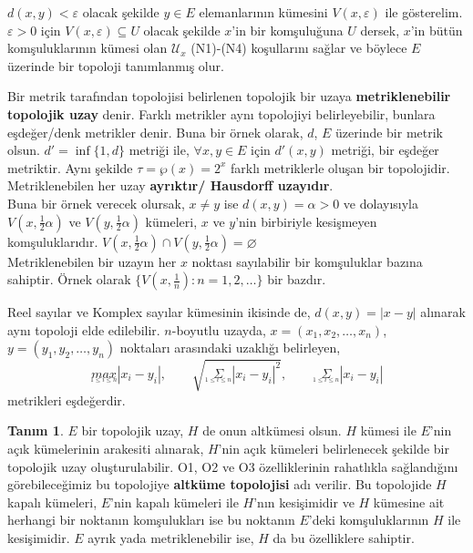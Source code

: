 \documentclass[11pt]{article}
\theoremstyle{plain}
\theoremstyle{definition}
\newtheorem{definition}{Tanım}
\theoremstyle{remark}
\numberwithin{equation}{section}
\renewcommand{\%}{{\small \%}}
\begin{document}
$d\left(x,y\right)<\varepsilon$ olacak şekilde $y\in E$ elemanlarının kümesini $V\left(x,\varepsilon \right)$ ile gösterelim.  $\varepsilon >0$ için $V\left(x,\varepsilon \right)\subseteq U$ olacak şekilde $x$'in bir komşuluğuna $U$ dersek, $x$'in bütün komşuluklarının kümesi olan $\mathscr{U}_x$ (N1)-(N4) koşullarını sağlar ve böylece $E$ üzerinde bir topoloji tanımlanmış olur.

Bir metrik tarafından topolojisi belirlenen topolojik bir uzaya \textbf{metriklenebilir topolojik uzay} denir. Farklı metrikler aynı topolojiyi belirleyebilir, bunlara eşdeğer/denk metrikler denir. Buna bir örnek olarak, $d$, $E$ üzerinde bir metrik olsun. $d'=\inf\{1,d\}$ metriği ile, $\forall x,y\in E$ için $d'\left(x,y\right)$ metriği, bir eşdeğer metriktir. Aynı şekilde $\tau=\wp(x)=2^x$ farklı metriklerle oluşan bir topolojidir.\\
Metriklenebilen her uzay  \textbf{ayrıktır/ Hausdorff uzayıdır}.\\
Buna bir örnek verecek olursak, $x\neq y$ ise $d\left(x,y\right)=\alpha >0$ ve dolayısıyla $V\left(x,\frac{1}{2}\alpha \right)$ ve $V\left(y,\frac{1}{2}\alpha \right)$ kümeleri, $x$ ve $y$'nin birbiriyle kesişmeyen komşuluklarıdır. 
$V\left(x,\frac{1}{2}\alpha \right)\cap V\left(y,\frac{1}{2}\alpha \right)=\varnothing$\\
Metriklenebilen bir uzayın her $x$ noktası sayılabilir bir komşuluklar bazına sahiptir. Örnek olarak $\{V\left(x,\frac{1}{n}\right): n=1,2,\ldots\}$ bir bazdır.

Reel sayılar ve Komplex sayılar kümesinin ikisinde de, $d\left(x,y\right)=|x-y|$ alınarak aynı topoloji elde edilebilir.
$n$-boyutlu uzayda, $x=(x_1 ,x_2 ,\ldots ,x_n)$, $y=(y_1 ,y_2 ,\ldots ,y_n)$ noktaları arasındaki uzaklığı belirleyen,
\[
\underset {_{1\leq i\leq n}}{max}|x_i -y_i|,\qquad \sqrt{\underset{_{1\leq i\leq n}}{\Sigma}|x_i -y_i|^2},\qquad \underset{_{1\leq i\leq n}}{\Sigma}|x_i -y_i|
\]
metrikleri eşdeğerdir.

\begin{definition}
$E$ bir topolojik uzay, $H$ de onun altkümesi olsun. $H$ kümesi ile $E$'nin açık kümelerinin arakesiti alınarak, $H$'nin açık kümeleri belirlenecek şekilde bir topolojik uzay oluşturulabilir. O1, O2 ve O3 özelliklerinin rahatlıkla sağlandığını görebileceğimiz bu topolojiye \textbf{altküme topolojisi} adı verilir. Bu topolojide $H$ kapalı kümeleri, $E$'nin kapalı kümeleri ile $H$'nın kesişimidir ve $H$ kümesine ait herhangi bir noktanın komşulukları ise bu noktanın $E$'deki komşuluklarının $H$ ile kesişimidir. $E$ ayrık yada metriklenebilir ise, $H$ da bu özelliklere sahiptir.\newpage
\end{definition}
\end{document}
